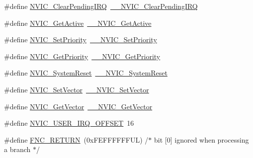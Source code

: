 \begin{DoxyCompactItemize}
\item 
\#define \hyperlink{group___c_m_s_i_s___core___n_v_i_c_functions_ga590cf113000a079b1f0ea3dcd5b5316c}{N\+V\+I\+C\+\_\+\+Clear\+Pending\+I\+RQ}~\hyperlink{group___c_m_s_i_s___core___n_v_i_c_functions_ga562a86dbdf14827d0fee8fdafb04d191}{\+\_\+\+\_\+\+N\+V\+I\+C\+\_\+\+Clear\+Pending\+I\+RQ}
\item 
\#define \hyperlink{group___c_m_s_i_s___core___n_v_i_c_functions_ga58ad3f352f832235ab3b192ff4745320}{N\+V\+I\+C\+\_\+\+Get\+Active}~\hyperlink{group___c_m_s_i_s___core___n_v_i_c_functions_gaa2837003c28c45abf193fe5e8d27f593}{\+\_\+\+\_\+\+N\+V\+I\+C\+\_\+\+Get\+Active}
\item 
\#define \hyperlink{group___c_m_s_i_s___core___n_v_i_c_functions_gae0e9d0e2f7b6133828c71b57d4941c35}{N\+V\+I\+C\+\_\+\+Set\+Priority}~\hyperlink{group___c_m_s_i_s___core___n_v_i_c_functions_ga505338e23563a9c074910fb14e7d45fd}{\+\_\+\+\_\+\+N\+V\+I\+C\+\_\+\+Set\+Priority}
\item 
\#define \hyperlink{group___c_m_s_i_s___core___n_v_i_c_functions_gaf59b9d0a791d2157abb319753953eceb}{N\+V\+I\+C\+\_\+\+Get\+Priority}~\hyperlink{group___c_m_s_i_s___core___n_v_i_c_functions_gaeb9dc99c8e7700668813144261b0bc73}{\+\_\+\+\_\+\+N\+V\+I\+C\+\_\+\+Get\+Priority}
\item 
\#define \hyperlink{group___c_m_s_i_s___core___n_v_i_c_functions_ga6aa0367d3642575610476bf0366f0c48}{N\+V\+I\+C\+\_\+\+System\+Reset}~\hyperlink{group___c_m_s_i_s___core___n_v_i_c_functions_ga0d9aa2d30fa54b41eb780c16e35b676c}{\+\_\+\+\_\+\+N\+V\+I\+C\+\_\+\+System\+Reset}
\item 
\#define \hyperlink{group___c_m_s_i_s___core___n_v_i_c_functions_ga804af63bb4c4c317387897431814775d}{N\+V\+I\+C\+\_\+\+Set\+Vector}~\hyperlink{group___c_m_s_i_s___core___n_v_i_c_functions_ga0df355460bc1783d58f9d72ee4884208}{\+\_\+\+\_\+\+N\+V\+I\+C\+\_\+\+Set\+Vector}
\item 
\#define \hyperlink{group___c_m_s_i_s___core___n_v_i_c_functions_ga955eb1c33a3dcc62af11a8385e8c0fc8}{N\+V\+I\+C\+\_\+\+Get\+Vector}~\hyperlink{group___c_m_s_i_s___core___n_v_i_c_functions_ga44b665d2afb708121d9b10c76ff00ee5}{\+\_\+\+\_\+\+N\+V\+I\+C\+\_\+\+Get\+Vector}
\item 
\#define \hyperlink{group___c_m_s_i_s___core___n_v_i_c_functions_ga8045d905a5ca57437d8e6f71ffcb6df5}{N\+V\+I\+C\+\_\+\+U\+S\+E\+R\+\_\+\+I\+R\+Q\+\_\+\+O\+F\+F\+S\+ET}~16
\item 
\#define \hyperlink{group___c_m_s_i_s___core___n_v_i_c_functions_gabaa62910bf89acc186ae998c611e64ab}{F\+N\+C\+\_\+\+R\+E\+T\+U\+RN}~(0x\+F\+E\+F\+F\+F\+F\+F\+F\+U\+L)     /$\ast$ bit \mbox{[}0\mbox{]} ignored when processing a branch                             $\ast$/

\end{DoxyCompactItemize}
